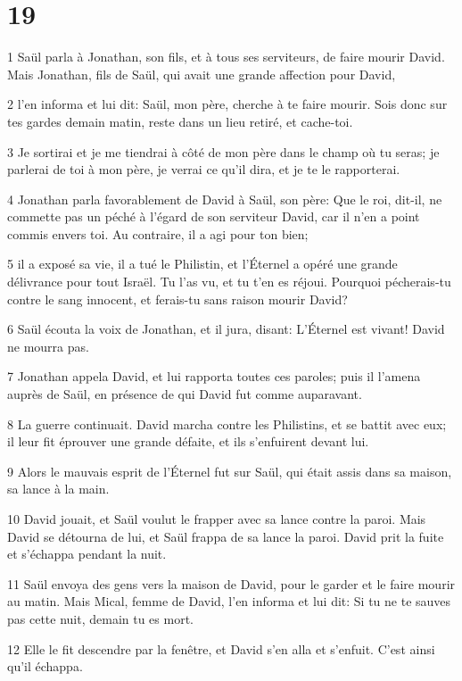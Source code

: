\chapter{19}

\par 1 Saül parla à Jonathan, son fils, et à tous ses serviteurs, de faire mourir David. Mais Jonathan, fils de Saül, qui avait une grande affection pour David,
\par 2 l'en informa et lui dit: Saül, mon père, cherche à te faire mourir. Sois donc sur tes gardes demain matin, reste dans un lieu retiré, et cache-toi.
\par 3 Je sortirai et je me tiendrai à côté de mon père dans le champ où tu seras; je parlerai de toi à mon père, je verrai ce qu'il dira, et je te le rapporterai.
\par 4 Jonathan parla favorablement de David à Saül, son père: Que le roi, dit-il, ne commette pas un péché à l'égard de son serviteur David, car il n'en a point commis envers toi. Au contraire, il a agi pour ton bien;
\par 5 il a exposé sa vie, il a tué le Philistin, et l'Éternel a opéré une grande délivrance pour tout Israël. Tu l'as vu, et tu t'en es réjoui. Pourquoi pécherais-tu contre le sang innocent, et ferais-tu sans raison mourir David?
\par 6 Saül écouta la voix de Jonathan, et il jura, disant: L'Éternel est vivant! David ne mourra pas.
\par 7 Jonathan appela David, et lui rapporta toutes ces paroles; puis il l'amena auprès de Saül, en présence de qui David fut comme auparavant.
\par 8 La guerre continuait. David marcha contre les Philistins, et se battit avec eux; il leur fit éprouver une grande défaite, et ils s'enfuirent devant lui.
\par 9 Alors le mauvais esprit de l'Éternel fut sur Saül, qui était assis dans sa maison, sa lance à la main.
\par 10 David jouait, et Saül voulut le frapper avec sa lance contre la paroi. Mais David se détourna de lui, et Saül frappa de sa lance la paroi. David prit la fuite et s'échappa pendant la nuit.
\par 11 Saül envoya des gens vers la maison de David, pour le garder et le faire mourir au matin. Mais Mical, femme de David, l'en informa et lui dit: Si tu ne te sauves pas cette nuit, demain tu es mort.
\par 12 Elle le fit descendre par la fenêtre, et David s'en alla et s'enfuit. C'est ainsi qu'il échappa.
